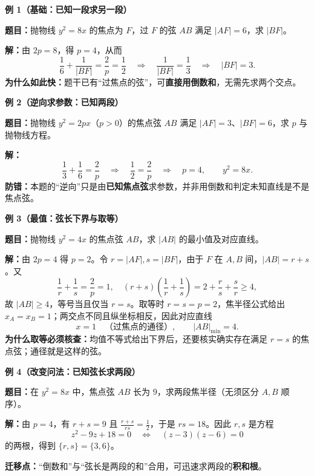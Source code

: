 \clearpage
\begin{examplebox}
\textbf{\textcolor{CExample}{例 1（基础：已知一段求另一段）}}

\textbf{题目：}抛物线 $y^2=8x$ 的焦点为 $F$，过 $F$ 的弦 $AB$ 满足 $|AF|=6$，求 $|BF|$。

\textbf{解：}由 $2p=8$，得 $p=4$，从而
\[
 \frac16+\frac1{|BF|}=\frac2p=\frac12
 \quad\Longrightarrow\quad \frac1{|BF|}=\frac13
 \quad\Longrightarrow\quad \boxed{|BF|=3}.
\]
\textbf{为什么如此快：}题干已有“过焦点的弦”，可\textbf{直接用倒数和}，无需先求两个交点。

\medskip
\textbf{\textcolor{CExample}{例 2（逆向求参数：已知两段）}}

\textbf{题目：}抛物线 $y^2=2px$（$p>0$）的焦点弦 $AB$ 满足 $|AF|=3$、$|BF|=6$，求 $p$ 与抛物线方程。

\textbf{解：}
\[
 \frac13+\frac16=\frac2p
 \quad\Longrightarrow\quad \frac12=\frac2p
 \quad\Longrightarrow\quad \boxed{p=4},\qquad\boxed{y^2=8x}.
\]
\textbf{防错：}本题的“逆向”只是由\textbf{已知焦点弦}求参数，并非用倒数和判定未知直线是不是焦点弦。

\medskip
\end{examplebox}
\clearpage
\begin{examplebox}
\textbf{\textcolor{CExample}{例 3（最值：弦长下界与取等）}}

\textbf{题目：}抛物线 $y^2=4x$ 的焦点弦 $AB$，求 $|AB|$ 的最小值及对应直线。

\textbf{解：}由 $2p=4$ 得 $p=2$。令 $r=|AF|,s=|BF|$，由于 $F$ 在 $A,B$ 间，$|AB|=r+s$。又
\[
 \frac1r+\frac1s=\frac2p=1,
 \quad
 (r+s)\left(\frac1r+\frac1s\right)
 =2+\frac rs+\frac sr\ge4,
\]
故 $\boxed{|AB|\ge4}$，等号当且仅当 $r=s$。取等时 $r=s=p=2$，焦半径公式给出 $x_A=x_B=1$；两交点不同且纵坐标相反，因此对应直线
\[
 \boxed{x=1}\quad\text{（过焦点的通径）},\qquad\boxed{|AB|_{\min}=4}.
\]
\textbf{为什么取等必须核查：}均值不等式给出下界后，还要核实确实存在满足 $r=s$ 的焦点弦；通径就是这样的弦。

\medskip
\textbf{\textcolor{CExample}{例 4（改变问法：已知弦长求两段）}}

\textbf{题目：}在 $y^2=8x$ 中，焦点弦 $AB$ 长为 $9$，求两段焦半径（无须区分 $A,B$ 顺序）。

\textbf{解：}由 $p=4$，有 $r+s=9$ 且 $\frac{r+s}{rs}=\frac12$，于是 $rs=18$。因此 $r,s$ 是方程
\[
 z^2-9z+18=0\quad\Longleftrightarrow\quad (z-3)(z-6)=0
\]
的两根，得到 $\boxed{\{r,s\}=\{3,6\}}$。

\textbf{迁移点：}“倒数和”与“弦长是两段的和”合用，可迅速求两段的\textbf{积和根}。

\medskip
\end{examplebox}
